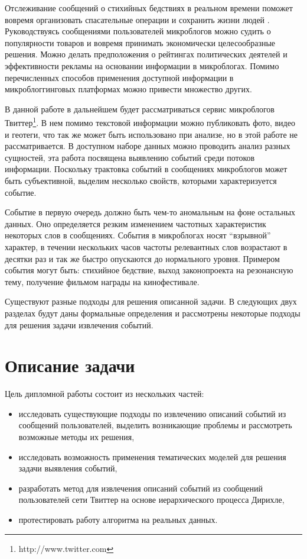 \documentclass[12pt, a4paper]{article}
\begin{document}
	Отслеживание сообщений о стихийных бедствиях в реальном времени поможет вовремя организовать спасательные операции и сохранить жизни людей \cite{nuggets}. Руководствуясь сообщениями пользователей микроблогов можно судить о популярности товаров и вовремя принимать экономически целесообразные решения. Можно делать предположения о рейтингах политических деятелей и эффективности рекламы на основании информации в микроблогах. Помимо перечисленных способов применения доступной информации в микроблоггинговых платформах можно привести множество других.
	
	В данной работе в дальнейшем будет рассматриваться сервис микроблогов Твиттер\footnote{http://www.twitter.com}. В нем помимо текстовой информации можно публиковать фото, видео и геотеги, что так же может быть использовано при анализе, но в этой работе не рассматривается. В доступном наборе данных можно проводить анализ разных сущностей, эта работа посвящена выявлению событий среди потоков информации. Поскольку трактовка событий в сообщениях микроблогов может быть субъективной, выделим несколько свойств, которыми характеризуется событие.
	
	Событие в первую очередь должно быть чем-то аномальным на фоне остальных данных. Оно определяется резким изменением частотных характеристик некоторых слов в сообщениях. События в микроблогах носят ``взрывной'' характер, в течении нескольких часов частоты релевантных слов возрастают в десятки раз и так же быстро опускаются до нормального уровня. Примером события могут быть: стихийное бедствие, выход законопроекта на резонансную тему, получение фильмом награды на кинофестивале.
	
	Существуют разные подходы для решения описанной задачи. В следующих двух разделах будут даны формальные определения и рассмотрены некоторые подходы для решения задачи извлечения событий.
	
  \section{Описание задачи}
	Цель дипломной работы состоит из нескольких частей:
\begin{itemize}
\item исследовать существующие подходы по извлечению описаний событий из сообщений пользователей, выделить возникающие проблемы и рассмотреть возможные методы их решения,
\item исследовать возможность применения тематических моделей для решения задачи выявления событий,
\item разработать метод для извлечения описаний событий из сообщений пользователей сети Твиттер на основе иерархического процесса Дирихле,
\item протестировать работу алгоритма на реальных данных.
\end{itemize}	  
  
\end{document}
